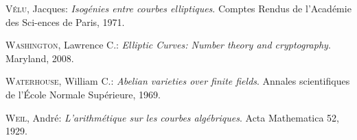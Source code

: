 \documentclass[12pt]{report}
\begin{document}
\begin{thebibliography}{97}
\textsc{Vélu}, Jacques: \textit{Isogénies entre courbes elliptiques}. Comptes Rendus de l’Académie des Sci-ences de Paris, 1971. 

\textsc{Washington}, Lawrence C.: \textit{Elliptic Curves: Number theory and cryptography}. Maryland, 2008. 

\textsc{Waterhouse}, William C.: \textit{Abelian varieties over finite fields}. Annales scientifiques de l’École Normale Supérieure, 1969.

\textsc{Weil}, André: \textit{L'arithmétique sur les courbes algébriques}.  Acta Mathematica 52, 1929. 


\end{thebibliography}
\end{document}
